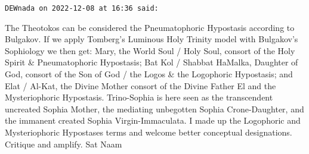\begin{footnotesize}
\texttt{DEWnada on 2022-12-08 at 16:36 said: }

The Theotokos can be considered the Pneumatophoric Hypostasis according to Bulgakov. If we apply
Tomberg's Luminous Holy Trinity model with Bulgakov's Sophiology we then get:
Mary, the World Soul / Holy Soul, consort of the Holy Spirit \& Pneumatophoric Hypostasis; Bat Kol / Shabbat HaMalka,
Daughter of God, consort of the Son of God / the Logos \& the Logophoric Hypostasis; and Elat / Al-Kat, the Divine
Mother consort of the Divine Father El and the Mysteriophoric Hypostasis. Trino-Sophia is here seen as the transcendent
uncreated Sophia Mother, the mediating unbegotten Sophia Crone-Daughter, and the immanent created Sophia
Virgin-Immaculata. I made up the Logophoric and Mysteriophoric Hypostases terms and welcome better conceptual
designations. Critique and amplify. Sat Naam

\end{footnotesize}

